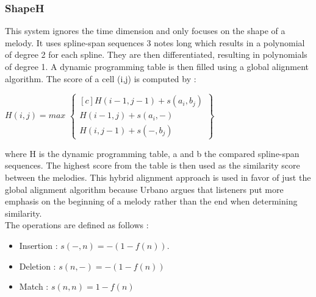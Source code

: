\documentclass{llncs}
\begin{document}
\begin{itemize}
        \subsubsection{ShapeH}
        This system ignores the time dimension and only focuses on the shape of a melody. It uses spline-span sequences 3 notes long which results in a polynomial of degree 2 for each spline. They are then differentiated, resulting in polynomials of degree 1. 
        A dynamic programming table is then filled using a global alignment algorithm. The score of a cell (i,j) is computed by : \\
        \begin{center}
            $H(i,j) = max $
            $\begin{Bmatrix*}[c]
            H(i-1, j-1) + s(a_i, b_j) \\
            H(i-1,j) + s(a_i, -) \\
            H(i, j-1) + s(-,b_j)
            \end{Bmatrix*}$
        \end{center}
		where H is the dynamic programming table, a and b the compared spline-span sequences. The highest score from the table is then used as the similarity score between the melodies. This hybrid alignment approach is used in favor of just the global alignment algorithm because Urbano argues that listeners put more emphasis on the beginning of a melody rather than the end when determining similarity. \\
		The operations are defined as follows : 
		
		\begin{center}
            \begin{itemize}
             \item Insertion : 
            $ s(-,n) = -(1-f(n)).$
            \item Deletion : 
             $s(n,-) = -(1 - f(n))$
            \item Match : 
            $s(n,n) = 1-f(n)$
            \end{itemize}
        \end{center}
            

\end{itemize}
\end{document}
